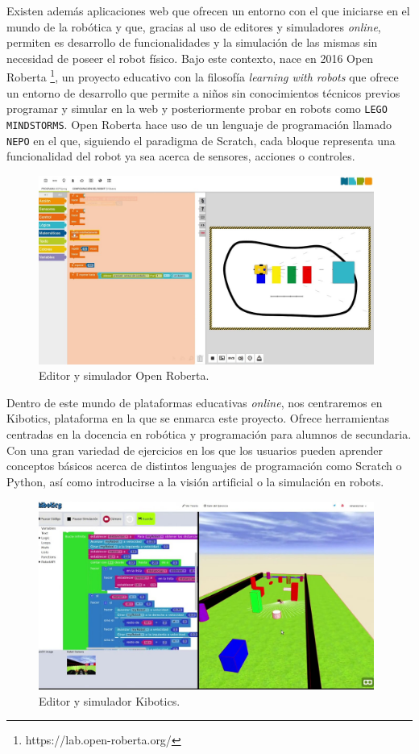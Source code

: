 \documentclass[a4paper, 12pt]{book}
\begin{document}
		Existen además aplicaciones web que ofrecen un entorno con el que iniciarse en el mundo de la robótica y que, gracias al uso de editores y simuladores \textit{online}, permiten es desarrollo de funcionalidades y la simulación de las mismas sin necesidad de poseer el robot físico. Bajo este contexto, nace en 2016 Open Roberta \footnote{https://lab.open-roberta.org/}, un proyecto educativo con la filosofía \textit{learning with robots} que ofrece un entorno de desarrollo que permite a niños sin conocimientos técnicos previos programar y simular en la web y posteriormente probar en robots como \texttt{LEGO MINDSTORMS}. Open Roberta hace uso de un lenguaje de programación llamado \texttt{NEPO} en el que, siguiendo el paradigma de Scratch, cada bloque representa una funcionalidad del robot ya sea acerca de sensores, acciones o controles. \\
		
		\begin{figure}[H]
			\centering
			\includegraphics[width=11cm, keepaspectratio]{img/open_roberta.jpg}
			\caption{Editor y simulador Open Roberta.}
			\label{fig:open_roberta}
		\end{figure}
		
		Dentro de este mundo de plataformas educativas \textit{online}, nos centraremos en Kibotics, plataforma en la que se enmarca este proyecto. Ofrece herramientas centradas en la docencia en robótica y programación para alumnos de secundaria. Con una gran variedad de ejercicios en los que los usuarios pueden aprender conceptos básicos acerca de distintos lenguajes de programación como Scratch o Python, así como introducirse a la visión artificial o la simulación en robots.
		
		\begin{figure}[H]
			\centering
			\includegraphics[width=11cm, keepaspectratio]{img/editor_simulador_kibotics.jpg}
			\caption{Editor y simulador Kibotics.}
			\label{fig:editor_simulador_kibotics}
		\end{figure}
\end{document}
